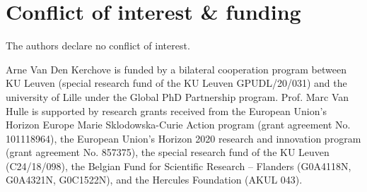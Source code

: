 \chapter*{Conflict of interest \& funding}
The authors declare no conflict of interest.

Arne Van Den Kerchove is funded by a bilateral cooperation program between KU
Leuven (special research fund of the KU Leuven GPUDL/20/031) and the university
of Lille under the Global PhD Partnership program.
Prof. Marc Van Hulle is supported by research grants received from
the European Union’s Horizon Europe Marie Sklodowska-Curie Action program
(grant agreement No. 101118964), the European Union’s Horizon 2020 research and
innovation program (grant agreement No. 857375), the special research fund of
the KU Leuven (C24/18/098), the Belgian Fund for Scientific Research – Flanders
(G0A4118N, G0A4321N, G0C1522N), and the Hercules
Foundation (AKUL 043).
